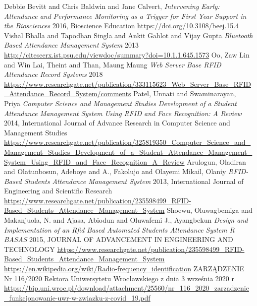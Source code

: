 \documentclass[declaration,shortabstract, mgr]{iithesis}
\begin{document}
\begin{thebibliography}{9}
		Debbie Bevitt and Chris Baldwin and Jane Calvert,
		\textit{Intervening Early: Attendance and Performance Monitoring as a Trigger for First Year Support in the Biosciences}
		2016, Bioscience Education
		\url{https://doi.org/10.3108/beej.15.4}
		Vishal Bhalla and Tapodhan Singla and Ankit Gahlot and Vijay Gupta
		\textit{Bluetooth Based Attendance Management System}
		2013
		\url{http://citeseerx.ist.psu.edu/viewdoc/summary?doi=10.1.1.645.1573}
		Oo, Zaw Lin and Win Lai, Theint and Than, Maung Maung
		\textit{Web Server Base RFID Attendance Record Systems}
		2018
		\url{https://www.researchgate.net/publication/333115623_Web_Server_Base_RFID_Attendance_Record_System/comments}
		Patel, Unnati and Swaminarayan, Priya
		\textit{Computer Science and Management Studies Development of a Student Attendance Management System Using RFID and Face Recognition: A Review}
		2014, International Journal of Advance Research in Computer Science and Management Studies
		\url{https://www.researchgate.net/publication/325819350_Computer_Science_and_Management_Studies_Development_of_a_Student_Attendance_Management_System_Using_RFID_and_Face_Recognition_A_Review}
		Arulogun, Oladiran and Olatunbosun, Adeboye and A., Fakolujo and Olayemi Mikail, Olaniy
		\textit{RFID-Based Students Attendance Management System}
		2013, International Journal of Engineering and Scientific Research
		\url{https://www.researchgate.net/publication/235598499_RFID-Based_Students_Attendance_Management_System}
		Shoewu, Oluwagbemiga and Makanjuola, N. and Ajasa, Abiodun and Oluwafemi J., Ayangbekun
		\textit{Design and Implementation of an Rfid Based Automated Students Attendance System R BASAS}
		2015, JOURNAL OF ADVANCEMENT IN ENGINEERING AND TECHNOLOGY
		\url{https://www.researchgate.net/publication/235598499_RFID-Based_Students_Attendance_Management_System}
		\url{https://en.wikipedia.org/wiki/Radio-frequency_identification}	
		ZARZĄDZENIE Nr 116/2020 Rektora Uniwersytetu Wrocławskiego z dnia 3 września 2020 r
		\url{https://bip.uni.wroc.pl/download/attachment/25560/nr_116_2020_zarzadzenie_funkcjonowanie-uwr-w-zwiazku-z-covid_19.pdf}
\end{thebibliography}
\end{document}
